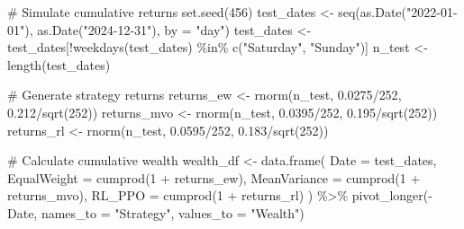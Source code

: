 \documentclass[
  10pt,
  a4paper,
]{article}
\newenvironment{Shaded}{\begin{snugshade}}{\end{snugshade}}
\newcommand{\AttributeTok}[1]{\textcolor[rgb]{0.40,0.45,0.13}{#1}}
\newcommand{\CommentTok}[1]{\textcolor[rgb]{0.37,0.37,0.37}{#1}}
\newcommand{\DecValTok}[1]{\textcolor[rgb]{0.68,0.00,0.00}{#1}}
\newcommand{\FloatTok}[1]{\textcolor[rgb]{0.68,0.00,0.00}{#1}}
\newcommand{\FunctionTok}[1]{\textcolor[rgb]{0.28,0.35,0.67}{#1}}
\newcommand{\NormalTok}[1]{\textcolor[rgb]{0.00,0.23,0.31}{#1}}
\newcommand{\OtherTok}[1]{\textcolor[rgb]{0.00,0.23,0.31}{#1}}
\newcommand{\SpecialCharTok}[1]{\textcolor[rgb]{0.37,0.37,0.37}{#1}}
\newcommand{\StringTok}[1]{\textcolor[rgb]{0.13,0.47,0.30}{#1}}
\begin{document}
\begin{Shaded}
\begin{Highlighting}[]
\CommentTok{\# Simulate cumulative returns}
\FunctionTok{set.seed}\NormalTok{(}\DecValTok{456}\NormalTok{)}
\NormalTok{test\_dates }\OtherTok{\textless{}{-}} \FunctionTok{seq}\NormalTok{(}\FunctionTok{as.Date}\NormalTok{(}\StringTok{"2022{-}01{-}01"}\NormalTok{), }\FunctionTok{as.Date}\NormalTok{(}\StringTok{"2024{-}12{-}31"}\NormalTok{), }\AttributeTok{by =} \StringTok{"day"}\NormalTok{)}
\NormalTok{test\_dates }\OtherTok{\textless{}{-}}\NormalTok{ test\_dates[}\SpecialCharTok{!}\FunctionTok{weekdays}\NormalTok{(test\_dates) }\SpecialCharTok{\%in\%} \FunctionTok{c}\NormalTok{(}\StringTok{"Saturday"}\NormalTok{, }\StringTok{"Sunday"}\NormalTok{)]}
\NormalTok{n\_test }\OtherTok{\textless{}{-}} \FunctionTok{length}\NormalTok{(test\_dates)}

\CommentTok{\# Generate strategy returns}
\NormalTok{returns\_ew }\OtherTok{\textless{}{-}} \FunctionTok{rnorm}\NormalTok{(n\_test, }\FloatTok{0.0275}\SpecialCharTok{/}\DecValTok{252}\NormalTok{, }\FloatTok{0.212}\SpecialCharTok{/}\FunctionTok{sqrt}\NormalTok{(}\DecValTok{252}\NormalTok{))}
\NormalTok{returns\_mvo }\OtherTok{\textless{}{-}} \FunctionTok{rnorm}\NormalTok{(n\_test, }\FloatTok{0.0395}\SpecialCharTok{/}\DecValTok{252}\NormalTok{, }\FloatTok{0.195}\SpecialCharTok{/}\FunctionTok{sqrt}\NormalTok{(}\DecValTok{252}\NormalTok{))}
\NormalTok{returns\_rl }\OtherTok{\textless{}{-}} \FunctionTok{rnorm}\NormalTok{(n\_test, }\FloatTok{0.0595}\SpecialCharTok{/}\DecValTok{252}\NormalTok{, }\FloatTok{0.183}\SpecialCharTok{/}\FunctionTok{sqrt}\NormalTok{(}\DecValTok{252}\NormalTok{))}

\CommentTok{\# Calculate cumulative wealth}
\NormalTok{wealth\_df }\OtherTok{\textless{}{-}} \FunctionTok{data.frame}\NormalTok{(}
  \AttributeTok{Date =}\NormalTok{ test\_dates,}
  \AttributeTok{EqualWeight =} \FunctionTok{cumprod}\NormalTok{(}\DecValTok{1} \SpecialCharTok{+}\NormalTok{ returns\_ew),}
  \AttributeTok{MeanVariance =} \FunctionTok{cumprod}\NormalTok{(}\DecValTok{1} \SpecialCharTok{+}\NormalTok{ returns\_mvo),}
  \AttributeTok{RL\_PPO =} \FunctionTok{cumprod}\NormalTok{(}\DecValTok{1} \SpecialCharTok{+}\NormalTok{ returns\_rl)}
\NormalTok{) }\SpecialCharTok{\%\textgreater{}\%}
  \FunctionTok{pivot\_longer}\NormalTok{(}\SpecialCharTok{{-}}\NormalTok{Date, }\AttributeTok{names\_to =} \StringTok{"Strategy"}\NormalTok{, }\AttributeTok{values\_to =} \StringTok{"Wealth"}\NormalTok{)}


\end{Highlighting}
\end{Shaded}
\end{document}
